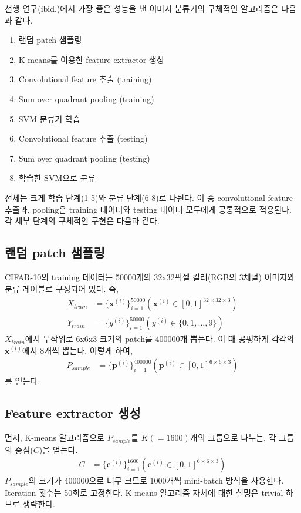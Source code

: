 \documentclass[a4paper,9pt]{article}
\begin{document}
\begin{multicols*}{2}
선행 연구(ibid.)에서 가장 좋은 성능을 낸 이미지 분류기의 구체적인 알고리즘은 다음과 같다.
\begin{enumerate}
\item 랜덤 patch 샘플링
\item K-means를 이용한 feature extractor 생성
\item Convolutional feature 추출 (training)
\item Sum over quadrant pooling (training)
\item SVM 분류기 학습
\item Convolutional feature 추출 (testing)
\item Sum over quadrant pooling (testing)
\item 학습한 SVM으로 분류
\end{enumerate}
전체는 크게 학습 단계(1-5)와 분류 단계(6-8)로 나뉜다.
이 중 convolutional feature 추출과, pooling은 training 데이터와 testing 데이터 모두에게 공통적으로 적용된다.
각 세부 단계의 구체적인 구현은 다음과 같다.

\subsection{랜덤 patch 샘플링}

CIFAR-10의 training 데이터는 50000개의 32x32픽셀 컬러(RGB의 3채널) 이미지와 분류 레이블로 구성되어 있다.
즉,
\begin{align*}
    X_{train} &= \{ \mathbf{x}^{(i)} \}_{i=1}^{50000} ( \mathbf{x}^{(i)} \in [0, 1]^{32 \times 32 \times 3} ) \\
    Y_{train} &= \{ y^{(i)} \}_{i=1}^{50000} ( y^{(i)} \in \{0, 1, ..., 9\} )
\end{align*}
$X_{train}$에서 무작위로 6x6x3 크기의 patch를 400000개 뽑는다.
이 때 공평하게 각각의 $\mathbf{x}^{(i)}$에서 8개씩 뽑는다.
이렇게 하여,
\begin{align*}
    P_{sample} &= \{ \mathbf{p}^{(i)} \}_{i=1}^{400000} ( \mathbf{p}^{(i)} \in [0, 1]^{6 \times 6 \times 3} )
\end{align*}
를 얻는다.

\subsection{Feature extractor 생성}
\label{sec:feature_extractor}

먼저, K-means 알고리즘으로 $P_{sample}$를 $K(=1600)$개의 그룹으로 나누는, 각 그룹의 중심($C$)을 얻는다.
\begin{align*}
    C &= \{ \mathbf{c}^{(i)} \}_{i=1}^{1600} ( \mathbf{c}^{(i)} \in [0, 1]^{6 \times 6 \times 3} )
\end{align*}
$P_{sample}$의 크기가 400000으로 너무 크므로 1000개씩 mini-batch 방식을 사용한다.
Iteration 횟수는 50회로 고정한다.
K-means 알고리즘 자체에 대한 설명은 trivial 하므로 생략한다.


\end{multicols*}
\end{document}
